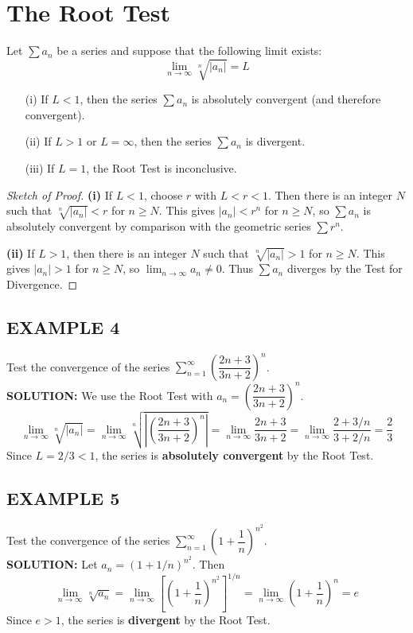 \documentclass{article}
\theoremstyle{mystyle}
\begin{document}
\section*{The Root Test}

\begin{tcolorbox}[
    colback=white,
    colframe=orange!80!white,
    title=The Root Test,
    boxrule=0.5mm,
    arc=3mm
    ]
    Let \( \sum a_n \) be a series and suppose that the following limit exists:
    \[ \lim_{n\to\infty} \sqrt[n]{|a_n|} = L \]
    \begin{itemize}
        \item[(i)] If \(L < 1\), then the series \( \sum a_n \) is absolutely convergent (and therefore convergent).
        \item[(ii)] If \(L > 1\) or \(L = \infty\), then the series \( \sum a_n \) is divergent.
        \item[(iii)] If \(L = 1\), the Root Test is inconclusive.
    \end{itemize}
\end{tcolorbox}
\begin{proof}[Sketch of Proof]
\textbf{(i)} If \(L < 1\), choose \(r\) with \(L < r < 1\). Then there is an integer \(N\) such that \(\sqrt[n]{|a_n|} < r\) for \(n \ge N\). This gives \(|a_n| < r^n\) for \(n \ge N\), so \( \sum a_n \) is absolutely convergent by comparison with the geometric series \( \sum r^n \).

\textbf{(ii)} If \(L > 1\), then there is an integer \(N\) such that \(\sqrt[n]{|a_n|} > 1\) for \(n \ge N\). This gives \(|a_n| > 1\) for \(n \ge N\), so \( \lim_{n\to\infty} a_n \neq 0 \). Thus \( \sum a_n \) diverges by the Test for Divergence.
\end{proof}

\subsection*{EXAMPLE 4}
Test the convergence of the series \( \sum_{n=1}^{\infty} \left( \dfrac{2n+3}{3n+2} \right)^n \).\\
\textbf{SOLUTION:}
We use the Root Test with \(a_n = \left( \dfrac{2n+3}{3n+2} \right)^n\).
\[ \lim_{n\to\infty} \sqrt[n]{|a_n|} = \lim_{n\to\infty} \sqrt[n]{\left| \left( \dfrac{2n+3}{3n+2} \right)^n \right|} = \lim_{n\to\infty} \dfrac{2n+3}{3n+2} = \lim_{n\to\infty} \dfrac{2+3/n}{3+2/n} = \dfrac{2}{3} \]
Since \(L = 2/3 < 1\), the series is \textbf{absolutely convergent} by the Root Test.

\subsection*{EXAMPLE 5}
Test the convergence of the series \( \sum_{n=1}^{\infty} \left( 1 + \dfrac{1}{n} \right)^{n^2} \).\\
\textbf{SOLUTION:}
Let \( a_n = (1+1/n)^{n^2} \). Then
\[ \lim_{n\to\infty} \sqrt[n]{a_n} = \lim_{n\to\infty} \left[ \left( 1 + \dfrac{1}{n} \right)^{n^2} \right]^{1/n} = \lim_{n\to\infty} \left( 1 + \dfrac{1}{n} \right)^n = e \]
Since \(e > 1\), the series is \textbf{divergent} by the Root Test.
\end{document}
